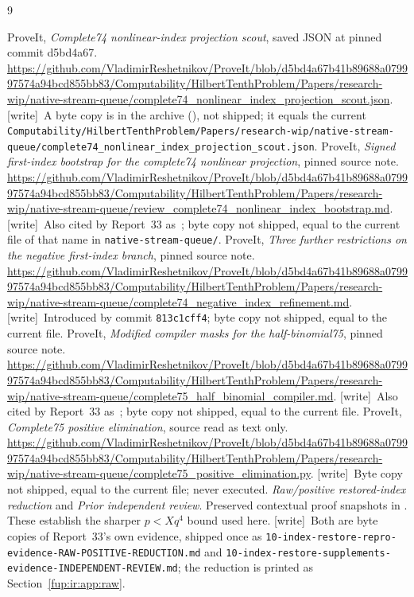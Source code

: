 \documentclass[11pt,letterpaper]{article}
\theoremstyle{definition}\newtheorem{definition}[theorem]{Definition}
\theoremstyle{remark}\newtheorem{remark}[theorem]{Remark}
\newcommand{\code}[1]{\texttt{\detokenize{#1}}}
\newcommand{\wtag}{\textup{[write]}}
\newcommand{\rw}[1]{\nolinkurl{#1}}%
\begin{document}
\renewcommand{\refname}{References of Report 37}
\begin{thebibliography}{9}\small\raggedright
{}
ProveIt, \emph{Complete74 nonlinear-index projection scout}, saved JSON at pinned commit d5bd4a67.
\url{https://github.com/VladimirReshetnikov/ProveIt/blob/d5bd4a67b41b89688a079997574a94bcd855bb83/Computability/HilbertTenthProblem/Papers/research-wip/native-stream-queue/complete74_nonlinear_index_projection_scout.json}. \wtag\ A byte copy is in the archive (\code{evidence/sources/}), not shipped; it equals the current \rw{Computability/HilbertTenthProblem/Papers/research-wip/native-stream-queue/complete74_nonlinear_index_projection_scout.json}.
ProveIt, \emph{Signed first-index bootstrap for the complete74 nonlinear projection}, pinned source note.
\url{https://github.com/VladimirReshetnikov/ProveIt/blob/d5bd4a67b41b89688a079997574a94bcd855bb83/Computability/HilbertTenthProblem/Papers/research-wip/native-stream-queue/review_complete74_nonlinear_index_bootstrap.md}. \wtag\ Also cited by Report~33 as~\cite{fup:ir:newbootstrap}; byte copy not shipped, equal to the current file of that name in \rw{native-stream-queue/}.
ProveIt, \emph{Three further restrictions on the negative first-index branch}, pinned source note.
\url{https://github.com/VladimirReshetnikov/ProveIt/blob/d5bd4a67b41b89688a079997574a94bcd855bb83/Computability/HilbertTenthProblem/Papers/research-wip/native-stream-queue/complete74_negative_index_refinement.md}. \wtag\ Introduced by commit \texttt{813c1cff4}; byte copy not shipped, equal to the current file.
ProveIt, \emph{Modified compiler masks for the half-binomial75}, pinned source note.
\url{https://github.com/VladimirReshetnikov/ProveIt/blob/d5bd4a67b41b89688a079997574a94bcd855bb83/Computability/HilbertTenthProblem/Papers/research-wip/native-stream-queue/complete75_half_binomial_compiler.md}. \wtag\ Also cited by Report~33 as~\cite{fup:ir:compiler}; byte copy not shipped, equal to the current file.
ProveIt, \emph{Complete75 positive elimination}, source read as text only.
\url{https://github.com/VladimirReshetnikov/ProveIt/blob/d5bd4a67b41b89688a079997574a94bcd855bb83/Computability/HilbertTenthProblem/Papers/research-wip/native-stream-queue/complete75_positive_elimination.py}. \wtag\ Byte copy not shipped, equal to the current file; never executed.
\emph{Raw/positive restored-index reduction} and \emph{Prior independent review}. Preserved contextual proof snapshots in \code{evidence/context/}. These establish the sharper $p<Xq^4$ bound used here. \wtag\ Both are byte copies of Report~33's own evidence, shipped once as \rw{10-index-restore-repro-evidence-RAW-POSITIVE-REDUCTION.md} and \rw{10-index-restore-supplements-evidence-INDEPENDENT-REVIEW.md}; the reduction is printed as Section~\ref{fup:ir:app:raw}.

\end{thebibliography}
\end{document}
